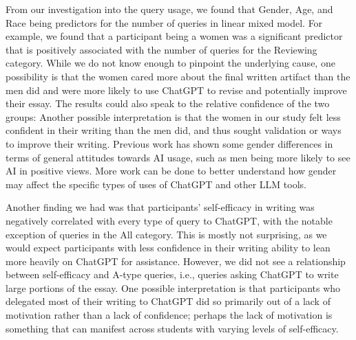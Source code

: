 \documentclass[manuscript,screen,acmsmall]{acmart}
\begin{document}
    From our investigation into the query usage, we found that Gender, Age, and Race being predictors for the number of queries in linear mixed model. 
    For example, we found that a participant being a women was a significant predictor that is positively associated with the number of queries for the Reviewing category.
    While we do not know enough to pinpoint the underlying cause, one possibility is that the women cared more about the final written artifact than the men did and were more likely to use ChatGPT to revise and potentially improve their essay.
    The results could also speak to the relative confidence of the two groups: 
    Another possible interpretation is that the women in our study felt less confident in their writing than the men did, and thus sought validation or ways to improve their writing.
    Previous work has shown some gender differences in terms of general attitudes towards AI usage, such as men being more likely to see AI in positive views. 
    More work can be done to better understand how gender may affect the specific types of uses of ChatGPT and other LLM tools.

    Another finding we had was that participants' self-efficacy in writing was negatively correlated with every type of query to ChatGPT, with the notable exception of queries in the All category.
    This is mostly not surprising, as we would expect participants with less confidence in their writing ability to lean more heavily on ChatGPT for assistance.
    However, we did not see a relationship between self-efficacy and A-type queries, i.e., queries asking ChatGPT to write large portions of the essay.
    One possible interpretation is that participants who delegated most of their writing to ChatGPT did so primarily out of a lack of motivation rather than a lack of confidence; perhaps the lack of motivation is something that can manifest across students with varying levels of self-efficacy.
    
\end{document}
